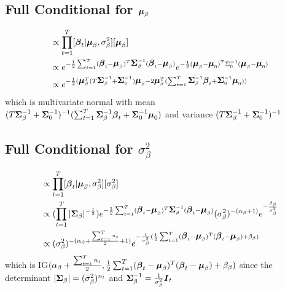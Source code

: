 \documentclass[fleqn]{article}
\def\bm#1{\mbox{\boldmath $#1$}}
\begin{document}
\subsection{Full Conditional for $\bm{\mu}_\beta$}
%
\begin{align*}
[\bm{\mu}_\beta | \cdot] & \propto \prod_{t = 1}^T [\bm{\beta}_t | \bm{\mu}_\beta, \sigma^2_\beta] [\bm{\mu}_\beta]\\
%
& \propto e^{ - \frac{1} {2} \sum_{t = 1}^T (\bm{\beta}_t - \bm{\mu}_\beta)^T \bm{\Sigma}_\beta^{ - 1} (\bm{\beta}_t - \bm{\mu}_\beta)} e^{ - \frac{1} {2} (\bm{\mu}_\beta - \bm{\mu}_0)^T \Sigma_0^{ - 1} (\bm{\mu}_\beta - \bm{\mu}_0)}\\
%
& \propto e^{ - \frac{1} {2} (
\bm{\mu}_\beta^T (T \bm{\Sigma}_\beta^{ - 1} + \bm{\Sigma}_0^{ - 1}) \bm{\mu}_\beta - 2 \bm{\mu}_\beta^T (\sum_{t = 1}^T \bm{\Sigma}_\beta^{ - 1} \bm{\beta}_t + \bm{\Sigma}_0^{ - 1} \bm{\mu}_0) ) }
\end{align*}
%
which is multivariate normal with mean
$(T \bm{\Sigma}_\beta^{ - 1} + \bm{\Sigma}_0^{ - 1})^{ - 1} (\sum_{t = 1}^T \bm{\Sigma}_\beta^{ - 1} \bm{\beta}_t + \bm{\Sigma}_0^{ - 1} \bm{\mu}_0)$ and variance $(T \bm{\Sigma}_\beta^{ - 1} + \bm{\Sigma}_0^{ - 1})^{ - 1}$
%
\subsection{Full Conditional for $\sigma^2_\beta$}
%
\begin{align*}
[\sigma^2_\beta | \cdot] & \propto \prod_{t = 1}^T [\bm{\beta}_t | \bm{\mu}_\beta, \sigma^2_\beta] [\sigma^2_\beta]\\
%
& \propto (\prod_{t = 1}^T |\bm{\Sigma}_\beta|^{ - \frac{1} {2}}) e^{ - \frac{1} {2} \sum_{t = 1}^T (\bm{\beta}_t - \bm{\mu}_\beta)^T \bm{\Sigma}_\beta^{ - 1} (\bm{\beta}_t - \bm{\mu}_\beta)} (\sigma^2_\beta)^{ - (\alpha_\beta + 1)} e^{ - \frac{\beta_\beta} {\sigma^2_\beta}}\\
%
& \propto (\sigma^2_\beta)^{ - (\alpha_\beta + \frac{\sum_{t = 1}^T n_t} {2} + 1)} e^{ - \frac{1} {\sigma^2_\beta} (\frac{1} {2} \sum_{t = 1}^T (\bm{\beta}_t - \bm{\mu}_\beta)^T (\bm{\beta}_t - \bm{\mu}_\beta) + \beta_\beta)}
\end{align*}
%
which is IG$(\alpha_\beta + \frac{\sum_{t = 1}^T n_t} {2}, \frac{1} {2} \sum_{t = 1}^T (\bm{\beta}_t - \bm{\mu}_\beta)^T (\bm{\beta}_t - \bm{\mu}_\beta) + \beta_\beta)$ since the determinant $|\bm{\Sigma}_\beta| = (\sigma^2_\beta)^{n_t}$ and $\bm{\Sigma}_\beta^{ - 1} = \frac{1} {\sigma^2_\beta} \bm{I}_t$
%
\end{document}
